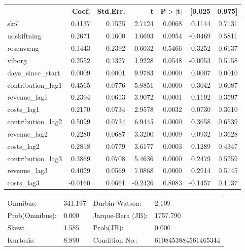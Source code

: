 \begin{table}
\begin{center}
\begin{tabular}{lrrrrrr}
\hline
                   &   Coef. & Std.Err. &       t & P$> |$t$|$ &  [0.025 & 0.975]  \\
\hline
skol               &  0.4137 &   0.1525 &  2.7124 &      0.0068 &  0.1144 & 0.7131  \\
udskiftning        &  0.2671 &   0.1600 &  1.6693 &      0.0954 & -0.0469 & 0.5811  \\
rosenvæng          &  0.1443 &   0.2392 &  0.6032 &      0.5466 & -0.3252 & 0.6137  \\
viborg             &  0.2552 &   0.1327 &  1.9228 &      0.0548 & -0.0053 & 0.5158  \\
days\_since\_start &  0.0009 &   0.0001 &  9.9783 &      0.0000 &  0.0007 & 0.0010  \\
contribution\_lag1 &  0.4565 &   0.0776 &  5.8851 &      0.0000 &  0.3042 & 0.6087  \\
revenue\_lag1      &  0.2394 &   0.0613 &  3.9072 &      0.0001 &  0.1192 & 0.3597  \\
costs\_lag1        &  0.2170 &   0.0734 &  2.9578 &      0.0032 &  0.0730 & 0.3610  \\
contribution\_lag2 &  0.5099 &   0.0734 &  6.9445 &      0.0000 &  0.3658 & 0.6539  \\
revenue\_lag2      &  0.2280 &   0.0687 &  3.3200 &      0.0009 &  0.0932 & 0.3628  \\
costs\_lag2        &  0.2818 &   0.0779 &  3.6177 &      0.0003 &  0.1289 & 0.4347  \\
contribution\_lag3 &  0.3869 &   0.0708 &  5.4636 &      0.0000 &  0.2479 & 0.5259  \\
revenue\_lag3      &  0.4029 &   0.0569 &  7.0868 &      0.0000 &  0.2914 & 0.5145  \\
costs\_lag3        & -0.0160 &   0.0661 & -0.2426 &      0.8083 & -0.1457 & 0.1137  \\
\hline
\end{tabular}
\end{center}

\begin{center}
\begin{tabular}{llll}
\hline
Omnibus:       & 341.197 & Durbin-Watson:    & 2.109                \\
Prob(Omnibus): & 0.000   & Jarque-Bera (JB): & 1757.790             \\
Skew:          & 1.585   & Prob(JB):         & 0.000                \\
Kurtosis:      & 8.890   & Condition No.:    & 6108453884561465344  \\
\hline
\end{tabular}
\end{center}
\end{table}
